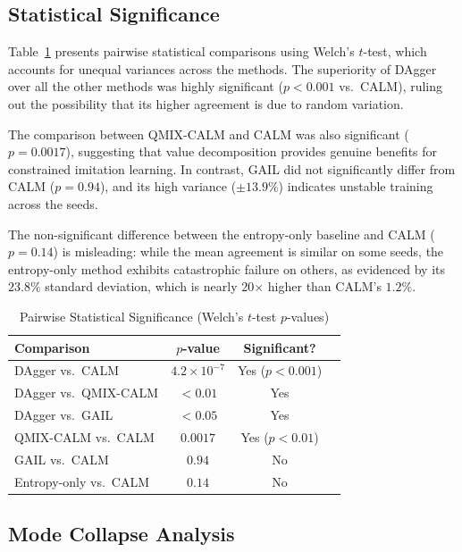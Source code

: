 \documentclass[journal]{IEEEtran}
\begin{document}
\subsection{Statistical Significance}

Table~\ref{tab:significance} presents pairwise statistical comparisons using Welch's $t$-test, which accounts for unequal variances across the methods. The superiority of DAgger over all the other methods was highly significant ($p < 0.001$ vs.\ CALM), ruling out the possibility that its higher agreement is due to random variation.

The comparison between QMIX-CALM and CALM was also significant ($p = 0.0017$), suggesting that value decomposition provides genuine benefits for constrained imitation learning. In contrast, GAIL did not significantly differ from CALM ($p = 0.94$), and its high variance ($\pm 13.9\%$) indicates unstable training across the seeds.

The non-significant difference between the entropy-only baseline and CALM ($p = 0.14$) is misleading: while the mean agreement is similar on some seeds, the entropy-only method exhibits catastrophic failure on others, as evidenced by its $23.8\%$ standard deviation, which is nearly 20$\times$ higher than CALM's $1.2\%$.

\begin{table}[t]
\centering
\caption{Pairwise Statistical Significance (Welch's $t$-test $p$-values)}
\label{tab:significance}
\begin{tabular}{lccc}
\toprule
\textbf{Comparison} & \textbf{$p$-value} & \textbf{Significant?} \\
\midrule
DAgger vs.\ CALM & $4.2 \times 10^{-7}$ & Yes ($p < 0.001$) \\
DAgger vs.\ QMIX-CALM & $< 0.01$ & Yes \\
DAgger vs.\ GAIL & $< 0.05$ & Yes \\
QMIX-CALM vs.\ CALM & $0.0017$ & Yes ($p < 0.01$) \\
GAIL vs.\ CALM & $0.94$ & No \\
Entropy-only vs.\ CALM & $0.14$ & No \\
\bottomrule
\end{tabular}
\end{table}

\subsection{Mode Collapse Analysis}
\end{document}
